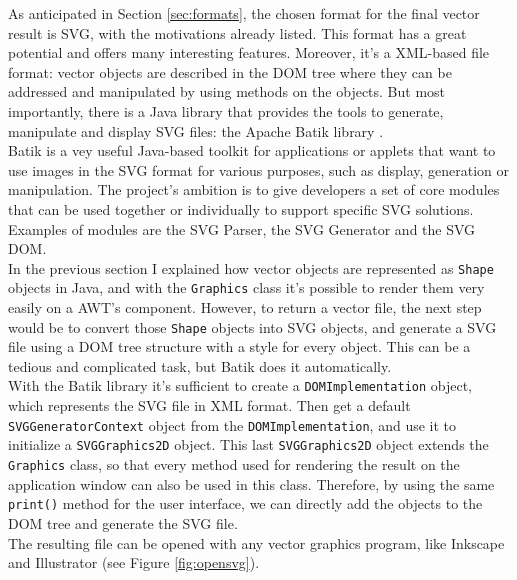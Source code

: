 \documentclass[]{usiinfbachelorproject}
\begin{document}
As anticipated in Section \ref{sec:formats}, the chosen format for the final vector result is SVG, with the motivations already listed. This format has a great potential and offers many interesting features. Moreover, it's a XML-based file format: vector objects are described in the DOM tree where they can be addressed and manipulated by using methods on the objects. But most importantly, there is a Java library that provides the tools to generate, manipulate and display SVG files: the Apache Batik library \cite{Batik}.\\
Batik is a vey useful Java-based toolkit for applications or applets that want to use images in the SVG format for various purposes, such as display, generation or manipulation. The project's ambition is to give developers a set of core modules that can be used together or individually to support specific SVG solutions. Examples of modules are the SVG Parser, the SVG Generator and the SVG DOM. \\
In the previous section I explained how vector objects are represented as {\tt Shape} objects in Java, and with the {\tt Graphics} class it's possible to render them very easily on a AWT's component. However, to return a vector file, the next step would be to convert those {\tt Shape} objects into SVG objects, and generate a SVG file using a DOM tree structure with a style for every object. This can be a tedious and complicated task, but Batik does it automatically.\\
With the Batik library it's sufficient to create a {\tt DOMImplementation} object, which represents the SVG file in XML format. Then get a default {\tt SVGGeneratorContext} object from the {\tt DOMImplementation}, and use it to initialize a {\tt SVGGraphics2D} object. This last {\tt SVGGraphics2D} object extends the {\tt Graphics} class, so that every method used for rendering the result on the application window can also be used in this class. Therefore, by using the same {\tt print()} method for the user interface, we can directly add the objects to the DOM tree and generate the SVG file.\\
The resulting file can be opened with any vector graphics program, like Inkscape and Illustrator (see Figure \ref{fig:opensvg}).
\end{document}
